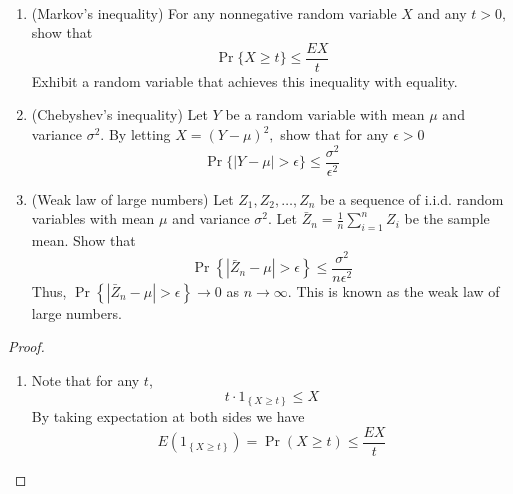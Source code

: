 \begin{exercise}{\par{~}
  \begin{enumerate}
    \item (Markov's inequality) For any nonnegative random variable $X$ and any $t>0,$ show that\begin{equation}\operatorname{Pr}\{X \geq t\} \leq \frac{E X}{t}\end{equation} Exhibit a random variable that achieves this inequality with equality. 
    \item (Chebyshev's inequality) Let $Y$ be a random variable with mean $\mu$ and variance $\sigma^{2} .$ By letting $X=(Y-\mu)^{2},$ show that for any $\epsilon>0$
    \begin{equation}
      \operatorname{Pr}\{|Y-\mu|>\epsilon\} \leq \frac{\sigma^{2}}{\epsilon^{2}}
    \end{equation}
    \item (Weak law of large numbers) Let $Z_{1}, Z_{2}, \ldots, Z_{n}$ be a sequence of i.i.d. random variables with mean $\mu$ and variance $\sigma^{2} .$ Let $\bar{Z}_{n}=\frac{1}{n} \sum_{i=1}^{n} Z_{i}$ be the sample mean. Show that
  \begin{equation}\operatorname{Pr}\left\{\left|\bar{Z}_{n}-\mu\right|>\epsilon\right\} \leq \frac{\sigma^{2}}{n \epsilon^{2}}\end{equation}
    Thus, $\operatorname{Pr}\left\{\left|\bar{Z}_{n}-\mu\right|>\epsilon\right\} \rightarrow 0$ as $n \rightarrow \infty .$ This is known as the weak law of large numbers.
  \end{enumerate}}
  \begin{proof}
  \par{~}
  \begin{enumerate}
    \item {
      Note that for any $t$,
      \begin{equation}
        t \cdot 1_{\left\{X\ge t\right\}} \le X
      \end{equation}
      By taking expectation at both sides we have
      \begin{equation}
        E(1_{\left\{X\ge t\right\}}) = \Pr (X\ge t) \le \frac{EX}{t}
      \end{equation}
    }

\end{enumerate}
\end{proof}
\end{exercise}
